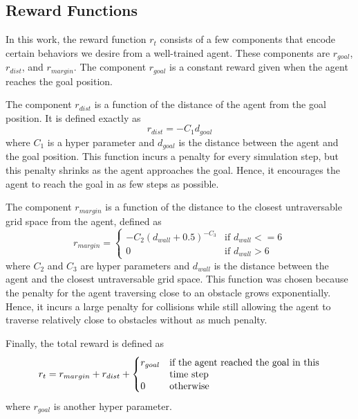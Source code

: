     \subsection{Reward Functions}
        In this work, the reward function $r_t$ consists of a few components that encode
        certain behaviors we desire from a well-trained agent. These components are $r_{goal}$,
        $r_{dist}$, and $r_{margin}$. The component $r_{goal}$ is a constant reward given
        when the agent reaches the goal position.
        
        The component $r_{dist}$ is a function of the distance of the agent from
        the goal position. It is defined exactly as
        \begin{equation}
            r_{dist} = -C_1 d_{goal}
        \end{equation}
        where $C_1$ is a hyper parameter and $d_{goal}$ is the distance between the agent and
        the goal position. This function incurs a penalty for every simulation step, but this
        penalty shrinks as the agent approaches the goal. Hence, it encourages the agent to
        reach the goal in as few steps as possible.

        The component $r_{margin}$ is a function of the distance to the closest untraversable
        grid space from the agent, defined as
        \begin{equation}
            r_{margin} =
                \begin{cases}
                    -C_2(d_{wall}+0.5)^{-C_3} & \text{if $d_{wall} <= 6$} \\
                    0 & \text{if $d_{wall} > 6$}
                \end{cases}
        \end{equation}
        where $C_2$ and $C_3$ are hyper parameters and $d_{wall}$ is the distance between the
        agent and the closest untraversable grid space. This function was chosen because the
        penalty for the agent traversing close to an obstacle grows exponentially. Hence, it
        incurs a large penalty for collisions while still allowing the agent to traverse
        relatively close to obstacles without as much penalty.

        Finally, the total reward is defined as
        \begin{equation}
            r_t = r_{margin} + r_{dist} +
                \begin{cases}
                    r_{goal} & \parbox[t]{.45\columnwidth}{if the agent reached the goal in this
                                                          time step} \\
                    0        & \text{otherwise}
                \end{cases}
        \end{equation}
        where $r_{goal}$ is another hyper parameter.

